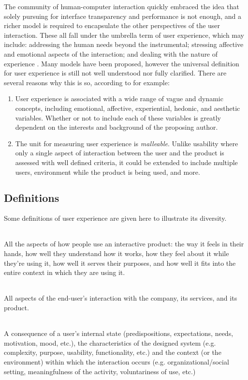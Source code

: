 \documentclass{acm_proc_article-sp}
\begin{document}
The community of human-computer interaction quickly embraced the idea
that solely pursuing for interface transparency and performance is not
enough, and a richer model is required to encapsulate the other
perspectives of the user interaction. These all fall under the
umbrella term of user experience, which may include: addressing the
human needs beyond the instrumental; stressing affective and emotional
aspects of the interaction; and dealing with the nature of experience
\citep{ux:hassenzahl}. Many models have been proposed, however the
universal definition for user experience is still not well understood
nor fully clarified. There are several reasons why this is so,
according to \citet{ux:law} for example:
\begin{enumerate}
  \item User experience is associated with a wide range of vague and
    dynamic concepts, including emotional, affective, experiential,
    hedonic, and aesthetic variables. Whether or not to include each
    of these variables is greatly dependent on the interests and
    background of the proposing author.
  \item The unit for measuring user experience is
    \textit{malleable}. Unlike usability where only a single aspect of
    interaction between the user and the product is assessed with well
    defined criteria, it could be extended to include multiple users,
    environment while the product is being used, and more.
\end{enumerate}

\subsection{Definitions}
Some definitions of user experience are given here to illustrate its
diversity.
\begin{description*}
  \item[\citet{experience:alben}] \hfill \\
    All the aspects of how people use an interactive product: the way
    it feels in their hands, how well they understand how it works,
    how they feel about it while they're using it, how well it serves
    their purposes, and how well it fits into the entire context in
    which they are using it.

  \item[\citet{experience:nielsen}] \hfill \\
    All aspects of the end-user's interaction with the company, its
    services, and its product.

  \item[\citet{ux:hassenzahl}] \hfill \\
    A consequence of a user's internal state (predispositions,
    expectations, needs, motivation, mood, etc.), the characteristics
    of the designed system (e.g. complexity, purpose, usability,
    functionality, etc.) and the context (or the environment) within
    which the interaction occurs (e.g. organizational/social setting,
    meaningfulness of the activity, voluntariness of use, etc.)
\end{description*}
\end{document}
